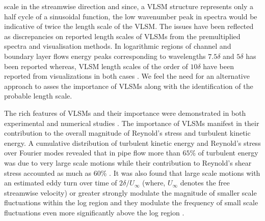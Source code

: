 \documentclass{amsart}
\begin{document}
scale in the streamwise direction and since, a VLSM structure represents only a half cycle of a sinusoidal function, the low wavenumber peak in spectra would be indicative of twice the length scale of the VLSM. The issues have been reflected as discrepancies on reported length scales of VLSMs from the premultiplied spectra and visualisation methods. In logarithmic regions of channel and boundary layer flows energy peaks corresponding to wavelengths $7.5\delta$ and $5\delta$ has been reported \citep{balakumar_adrian_ptrs_07} whereas, VLSM length scales of the order of $10\delta$ have been reported from visualizations in both cases \citep{Lee_sung_jfm11,lee_sung_jfm_14,hutchins_marusic_jfm2007}. We feel the need for an alternative approach to asses the importance of VLSMs along with the identification of the probable length scale. 
 

The rich features of VLSMs and their importance were demonstrated in both experimental \citep{kim_adrian_pof99,guala_adrian_jfm2006,hutchins_marusic_jfm2007,monty_jfm_07} and numerical studies \citep{fang2015blm,lee_sung_jfm_14,Lee_sung_jfm11}. The importance of VLSMs manifest in their  contribution to the overall magnitude of Reynold's stress and turbulent kinetic  energy.  A cumulative  distribution  of turbulent kinetic energy  and Reynold's stress  over Fourier modes revealed that in pipe flow  more than $65\%$ of turbulent energy was due to very large scale motions while their contribution to Reynold's shear stress accounted as much as $60\%$ \citep{guala_adrian_jfm2006}. It was also found that large scale motions with an estimated eddy turn over time of $2\delta/U_{\infty}$ (where, $U_{\infty}$ denotes the free streamwise velocity) or greater strongly modulate the magnitude of smaller scale fluctuations within the log region and they modulate the frequency of small scale fluctuations even more significantly above the log region \citep{ganapathi_jfm_2012_modulation}. 
\end{document}
